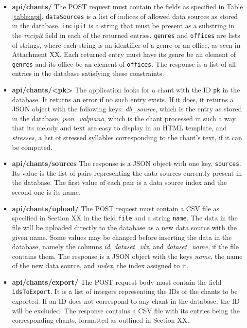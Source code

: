 \begin{itemize}

\item \textbf{api/chants/} The POST request must contain the fields as specified in Table \ref{table:api}. \verb|dataSources| is a list of indices of allowed data sources as stored
in the database. \verb|incipit| is a string that must be present as a substring in the \emph{incipit} field in each of the returned entries. \verb|genres| and \verb|offices|
are lists of strings, where each string is an identifier of a genre or an office, as seen in Attachment XX. Each returned entry must have its genre be an element of \verb|genres|
and its office be an element of \verb|offices|. The response is a list of all entries in the database satisfying these constraints.

\item \textbf{api/chants/\textless pk\textgreater} The application looks for a chant with the ID \verb|pk| in the database. It returns an error if no such entry exists. If it does,
it returns a JSON object with the following keys: \emph{db\_source}, which is the entry as stored in the database, \emph{json\_volpiano}, which is the chant processed in
such a way that its melody and text are easy to display in an HTML template, and \emph{stresses}, a list of stressed syllables corresponding to the chant's text, if it
can be computed.

\item \textbf{api/chants/sources} The response is a JSON object with one key, \verb|sources|. Its value is the list of pairs representing the data sources currently present in
the database. The first value of each pair is a data source index and the second one is its name.

\item \textbf{api/chants/upload/} The POST request must contain a CSV file as specified in Section XX in the field \verb|file| and a string \verb|name|. The data in the file
will be uploaded directly to the database as a new data source with the given name. Some values may be changed before inserting the data in the database, namely the columns
\emph{id}, \emph{dataset\_idx}, and \emph{dataset\_name}, if the file contains them. The response is a JSON object with the keys \emph{name}, the name of the new data
source, and \emph{index}, the index assigned to it.

\item \textbf{api/chants/export/} The POST request body must contain the field \verb|idsToExport|. It is a list of integers representing the IDs of the chants to be exported. If
an ID does not correspond to any chant in the database, the ID will be excluded. The response contains a CSV file with its entries being the corresponding chants, formatted
as outlined in Section XX.


\end{itemize}
